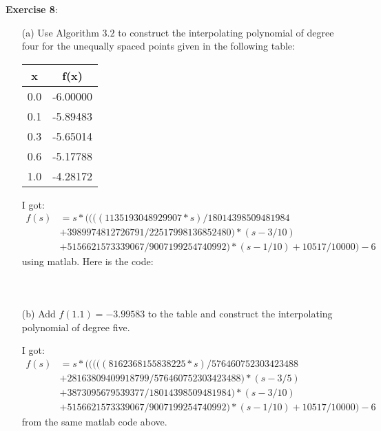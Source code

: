 \documentclass{article}
\begin{document}
\textbf{Exercise 8}: \begin{itemize}
    \item [(a)] Use Algorithm $3.2$ to construct the interpolating polynomial of degree four for the unequally spaced points given in the following table:
        \begin{center}
            \begin{tabular}{ c c }
                \hline x   & f(x)     \\
                \hline 0.0 & -6.00000 \\
                \hline 0.1 & -5.89483 \\
                \hline 0.3 & -5.65014 \\
                \hline 0.6 & -5.17788 \\
                \hline 1.0 & -4.28172   
            \end{tabular}
        \end{center}
        \begin{answer}
            I got:
                \begin{align*}
                    f(s) &= s*((((1135193048929907*s)/18014398509481984  \\
                        &+ 3989974812726791/22517998136852480)*(s - 3/10) \\
                        &+ 5156621573339067/9007199254740992)*(s - 1/10) + 10517/10000) - 6
                \end{align*}
            using matlab. Here is the code:
        \inputminted{matlab}{code/NewtonForwardDifference/NewtonForwardDifference.m}
        \inputminted{matlab}{code/NewtonForwardDifference/forwardPoly.m}
        \inputminted{matlab}{code/script2.m}
        \end{answer}

    \item [(b)] Add $f(1.1) = -3.99583$ to the table and construct the interpolating polynomial of degree five. 
        \begin{answer}
            I got:
                \begin{align*}
                    f(s) &= s*(((((8162368155838225*s)/576460752303423488 \\
                    &+ 28163809409918799/576460752303423488)*(s - 3/5) \\
                    &+ 3873095679539377/18014398509481984)*(s - 3/10) \\
                    &+ 5156621573339067/9007199254740992)*(s - 1/10) + 10517/10000) - 6
                \end{align*}
            from the same matlab code above.
        \end{answer}
\end{itemize}
\end{document}

